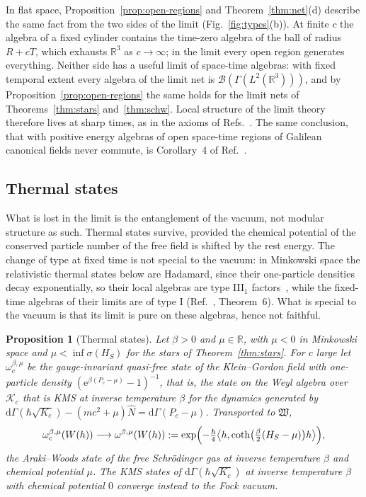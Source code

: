 \documentclass[%
 aip,
 jmp,
 amsmath,amssymb,
 reprint, onecolumn
]{revtex4-1}
\newtheorem{proposition}{Proposition}
\theoremstyle{definition}
\theoremstyle{remark}
\newcommand{\R}{\mathbb{R}}
\newcommand{\K}{\mathcal{K}}
\newcommand{\rmd}{\mathrm{d}}
\newcommand{\rme}{\mathrm{e}}
\begin{document}
In flat space, Proposition~\ref{prop:open-regions} and
Theorem~\ref{thm:net}(d) describe the same fact from the two sides of
the limit (Fig.~\ref{fig:types}(b)). At finite $c$ the algebra of a fixed cylinder contains the
time-zero algebra of the ball of radius $R+cT$, which exhausts $\R^3$ as
$c\to\infty$; in the limit every open region generates everything.
Neither side has a useful limit of space-time algebras: with fixed
temporal extent every algebra of the limit net is
$\mathcal{B}(\Gamma(L^2(\R^3)))$, and by
Proposition~\ref{prop:open-regions} the same holds for the limit nets of
Theorems~\ref{thm:stars} and~\ref{thm:schw}. Local structure of
the limit theory therefore lives at sharp times, as in the axioms of
Refs.~. The same conclusion, that
with positive energy algebras of open space-time regions of Galilean
canonical fields never commute, is Corollary~4 of
Ref.~.

\subsection{Thermal states}\label{sec:thermal}

What is lost in the limit is the entanglement of the vacuum, not modular
structure as such. Thermal states survive, provided the chemical
potential of the conserved particle number of the free field is shifted
by the rest energy. The change of type at fixed time is not special to
the vacuum: in Minkowski space the relativistic thermal states below are
Hadamard, since their one-particle densities decay exponentially, so
their local algebras are type III$_1$ factors~\cite{Verch1997}, while the
fixed-time algebras of their limits are of type I
(Ref.~,
Theorem~6). What is special to the vacuum is that its limit is pure on
these algebras, hence not faithful.

\begin{proposition}[Thermal states]\label{prop:thermal}
Let $\beta>0$ and $\mu\in\R$, with $\mu<0$ in Minkowski space and
$\mu<\inf\sigma(H_S)$ for the stars of Theorem~\ref{thm:stars}. For
$c$ large let $\omega_c^{\beta,\mu}$ be the gauge-invariant quasi-free
state of the Klein--Gordon field with one-particle density
$(\rme^{\beta(P_c-\mu)}-1)^{-1}$, that is, the state on the Weyl algebra
over $\K_c$ that is KMS at inverse temperature $\beta$ for the dynamics
generated by $\rmd\Gamma(\hbar\sqrt{K_c})-(mc^2+\mu)\hat N=
\rmd\Gamma(P_c-\mu)$. Transported to $\mathfrak W$,
\[
\omega_c^{\beta,\mu}(W(h))\longrightarrow\omega^{\beta,\mu}(W(h)):=
\exp\Bigl(-\tfrac\hbar4\bigl\langle h,\coth\bigl(\tfrac\beta2(H_S-\mu)
\bigr)h\bigr\rangle\Bigr),
\]
the Araki--Woods state of the free Schr\"odinger gas at inverse
temperature $\beta$ and chemical potential $\mu$. The KMS states of
$\rmd\Gamma(\hbar\sqrt{K_c})$ at inverse temperature $\beta$ with
chemical potential $0$ converge instead to the Fock vacuum.
\end{proposition}
\end{document}
